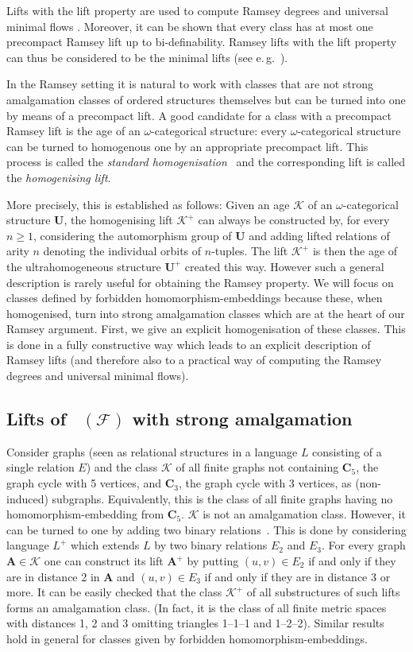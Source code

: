 \documentclass{elsarticle}
\newcommand{\eg}{e.\,g.}
\def\Forb{\mathop{\mathrm{Forb_{he}}}\nolimits}
\def\str#1{\mathbf {#1}}
\def\F{{\mathcal F}}
\def\K{{\mathcal K}}
\theoremstyle{plain}
\theoremstyle{definition}
\theoremstyle{remark}
\begin{document}
Lifts with the lift property are used to compute Ramsey degrees and universal
minimal flows \cite{Kechris2005}. Moreover, it can be shown that every class
has at most one precompact Ramsey lift up to bi-definability. Ramsey lifts with
the lift property can thus be considered to be the minimal lifts (see \eg{}\ \cite{The2013}).

In the Ramsey setting it is natural to work with classes that are not strong
amalgamation classes of ordered structures themselves but can be turned into
one by means of a precompact lift. 
A good candidate for a class with a precompact Ramsey lift is the age of an
$\omega$-categorical structure: every  $\omega$-categorical structure can
be turned to homogenous one by an appropriate precompact lift. 
This process is called the \emph{standard homogenisation}~\cite{Covington1990} and the corresponding lift is called the \emph{homogenising lift}.

More precisely, this is established as follows:
Given an age $\K$ of an $\omega$-categorical structure $\str{U}$, the homogenising
lift $\K^+$ can always be constructed by, for every $n\geq 1$, considering the
automorphism group of $\str{U}$ and adding lifted relations of arity $n$
denoting the individual orbits of $n$-tuples. The lift $\K^+$
is then the age of the ultrahomogeneous structure $\str{U}^+$ created this way.
However such a general description is rarely useful
for obtaining the Ramsey property.
We will focus on classes defined by forbidden homomorphism-embeddings because
these, when homogenised, turn into strong amalgamation classes which are at the heart
of our Ramsey argument.
First, we give an explicit homogenisation of these classes.
 This is done in a fully constructive way which
leads to an explicit description of Ramsey lifts (and therefore also to a practical way of
computing the Ramsey degrees and universal minimal flows). 

\subsection{Lifts of $\Forb(\F)$ with strong amalgamation}
Consider graphs (seen as relational structures in a language $L$ consisting of a single relation $E$) and the class $\K$ of all finite graphs
not containing $\str{C}_5$, the graph cycle with 5 vertices, and $\str{C}_3$, the graph cycle with 3 vertices, as (non-induced) subgraphs. Equivalently, this is the class of all finite graphs having no homomorphism-embedding from $\str{C}_5$. $\K$
is not an amalgamation class. However, it can be turned
to one by adding two binary relations~\cite{Komjath1988,Komjath1999,Cherlin1999}. This is done by considering language $L^+$ which extends $L$ by two binary relations $E_2$ and $E_3$.
For every graph $\str{A}\in \K$ one can construct its lift $\str{A}^+$ by putting $(u,v)\in E_2$ if and only if they are in distance 2 in $\str{A}$ and $(u,v)\in E_3$ if and only if they are in distance 3 or more. It can be easily checked that the class $\K^+$ of all substructures of such lifts forms an amalgamation class. (In fact, it is the class of all finite metric spaces with distances 1, 2 and 3 omitting triangles 1--1--1 and 1--2--2).
Similar results hold in general for classes given by forbidden homomorphism-embeddings.
\end{document}
